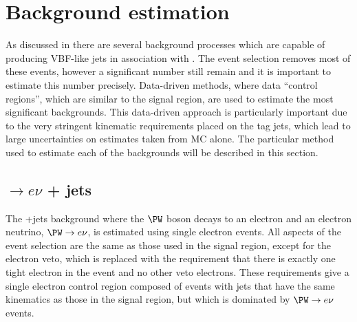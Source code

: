 \section{Background estimation}
\label{sec:promptbkg}
As discussed in  there are several background processes which are capable of producing VBF-like jets in association with \MET. The event selection removes most of these events, however a significant number still remain and it is important to estimate this number precisely. Data-driven methods, where data ``control regions'', which are similar to the signal region, are used to estimate the most significant backgrounds. This data-driven approach is particularly important due to the very stringent kinematic requirements placed on the tag jets, which lead to large uncertainties on estimates taken from \ac{MC} alone. The particular method used to estimate each of the backgrounds will be described in this section.

\subsection{\PW$\rightarrow e\nu$ + jets}
\label{sec:promptwenu}
The \PW+jets background where the $\PW$ boson decays to an electron and an electron neutrino, $\PW\rightarrow e\nu$, is estimated using single electron events. All aspects of the event selection are the same as those used in the signal region, except for the electron veto, which is replaced with the requirement that there is exactly one tight electron in the event and no other veto electrons. These requirements give a single electron control region composed of events with jets that have the same kinematics as those in the signal region, but which is dominated by $\PW\rightarrow e\nu$ events.

